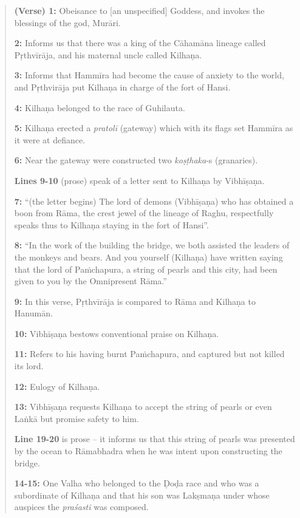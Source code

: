 \begin{quote}
{\bf (Verse) 1:} Obeisance to [an unspecified] Goddess, and invokes the blessings of the god, Murāri.

\smallskip
{\bf 2:} Informs us that there was a king of the Cāhamāna lineage called Pṛthvīrāja, and his maternal uncle called Kilhaṇa. 

\smallskip
{\bf 3:} Informs that Hammīra had become the cause of anxiety to the world, and Pṛthvirāja put Kilhaṇa in charge of the fort of Hansi. 

\smallskip
{\bf 4:} Kilhaṇa belonged to the race of Guhilauta. 

\smallskip
{\bf 5:} Kilhaṇa erected a {\sl pratolī} (gateway) which with its flags set Hammīra as it were at defiance. 

\smallskip
{\bf 6:} Near the gateway were constructed two {\sl koṣṭhaka}-s (granaries).

\smallskip
{\bf Lines 9-10} (prose) speak of a letter sent to Kilhaṇa by Vibhīṣaṇa.

\smallskip
{\bf 7:} “(the letter begins) The lord of demons (Vibhīṣaṇa) who has obtained a boon from Rāma, the crest jewel of the lineage of Raghu, respectfully speaks thus to Kilhaṇa staying in the fort of Hansi”.  

\smallskip
{\bf 8:} “In the work of the building the bridge, we both assisted the leaders of the monkeys and bears. And you yourself (Kilhaṇa) have written saying that the lord of Paṁchapura, a string of pearls and this city, had been given to you by the Omnipresent Rāma.”

\smallskip
{\bf 9:} In this verse, Pṛthvīrāja is compared to Rāma and Kilhaṇa to Hanumān. 

\smallskip
{\bf 10:} Vibhīṣaṇa bestows conventional praise on Kilhaṇa. 

\smallskip
{\bf 11:} Refers to his having burnt Paṁchapura, and captured but not killed its lord.

\smallskip
{\bf 12:} Eulogy of Kilhaṇa.

\smallskip
{\bf 13:} Vibhīṣaṇa requests Kilhaṇa to accept the string of pearls or even Laṅkā but promise safety to him.

\smallskip
{\bf Line 19-20} is prose – it informs us that this string of pearls was presented by the ocean to Rāmabhadra when he was intent upon constructing the bridge.

{\bf 14-15:} One Valha who belonged to the Ḍoḍa race and who was a subordinate of Kilhaṇa and that his son was Lakṣmaṇa under whose auspices the {\sl praśasti} was composed.
\end{quote}

